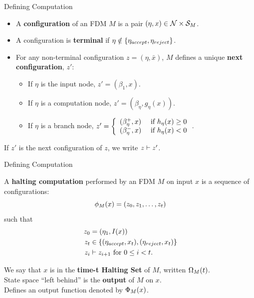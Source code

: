 \documentclass[c]{beamer}
\begin{document}
\begin{frame}{Defining Computation}

  \begin{itemize}
    \setlength{\itemsep}{3mm}
  \item[] A \textbf{configuration} of an FDM $M$ is a pair $(\eta, x) \in
    \mathcal{N} \times \mathcal{S}_M$.\pause
  \item[] A configuration is \textbf{terminal} if $\eta \notin
    \{\eta_{accept}, \eta_{reject}\}$.\pause
  \item[] For any non-terminal configuration $z = (\eta, \bar{x})$, $M$
    defines a unique \textbf{next configuration}, $z'$:\\
    
    \begin{itemize}
    \item If $\eta$ is the input node, $z' = (\beta_{1}, x)$.
    \item If $\eta$ is a computation node, $z' = (\beta_{\eta}, g_\eta(x))$.
    \item If $\eta$ is a branch node, $z' = \left\{ \begin{array}{ll} (\beta_\eta^+,x) & \text{ if } h_\eta(x) \geq 0 \\ (\beta_\eta^-, x) & \text{ if } h_\eta(x) < 0 \end{array} \right.$.
    \end{itemize}
  \end{itemize}\pause

  \vspace{\baselineskip}

  If $z'$ is the next configuration of $z$, we write $z \vdash z'$.

\end{frame}

\begin{frame}{Defining Computation}

  A \textbf{halting computation} performed by an FDM $M$ on input $x$
  is a sequence of configurations: 
  $$\phi_M(x) = (z_0, z_1, \ldots, z_t)$$ such that
  \begin{align*}
    z_0 &= (\eta_1, I(x))\\
    z_t &\in \{(\eta_{accept}, x_t), (\eta_{reject}, x_t)\}\\
    z_i &\vdash z_{i+1} \text{ for } 0 \leq i < t.
  \end{align*}\pause
  
  
  We say that $x$ is in the \textbf{time-t Halting Set} of $M$,
  written $\Omega_M(t)$.\pause  \\

  State space ``left behind'' is the \textbf{output} of $M$ on $x$.\\

  Defines an output function denoted by $\Phi_M(x)$.

\end{frame}
\end{document}

